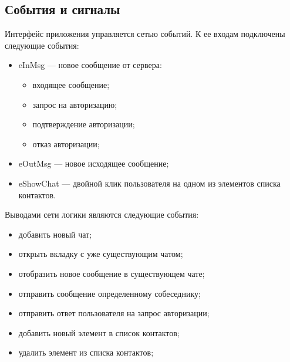 \subsection{События и сигналы}\label{events_and_signals}
Интерфейс приложения управляется сетью событий.
К ее входам подключены следующие события:
\begin{itemize}
    \item eInMsg --- новое сообщение от сервера:
    \begin{itemize}
        \item входящее сообщение;
        \item запрос на авторизацию;
        \item подтверждение авторизации;
        \item отказ авторизации;
    \end{itemize}
    \item eOutMsg --- новое исходящее сообщение;
    \item eShowChat --- двойной клик пользователя на одном из элементов списка контактов.
\end{itemize}
Выводами сети логики являются следующие события:
\begin{itemize}
    \item добавить новый чат;
    \item открыть вкладку с уже существующим чатом;
    \item отобразить новое сообщение в существующем чате;
    \item отправить сообщение определенному собеседнику;
    \item отправить ответ пользователя на запрос авторизации;
    \item добавить новый элемент в список контактов;
    \item удалить элемент из списка контактов;
\end{itemize}


